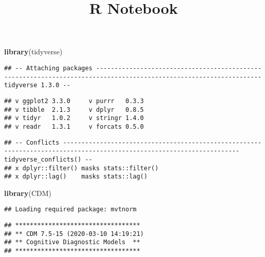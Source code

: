\documentclass[]{article}
\title{R Notebook}
\author{}
\date{\vspace{-2.5em}}
\newenvironment{Shaded}{\begin{snugshade}}{\end{snugshade}}
\newcommand{\KeywordTok}[1]{\textcolor[rgb]{0.13,0.29,0.53}{\textbf{#1}}}
\newcommand{\NormalTok}[1]{#1}
\newcommand{\OperatorTok}[1]{\textcolor[rgb]{0.81,0.36,0.00}{\textbf{#1}}}
\newcommand{\StringTok}[1]{\textcolor[rgb]{0.31,0.60,0.02}{#1}}
\begin{document}
\maketitle

\begin{Shaded}
\begin{Highlighting}[]
\KeywordTok{library}\NormalTok{(tidyverse)}
\end{Highlighting}
\end{Shaded}

\begin{verbatim}
## -- Attaching packages ------------------------------------------------------------------------------------------------------------------- tidyverse 1.3.0 --
\end{verbatim}

\begin{verbatim}
## v ggplot2 3.3.0     v purrr   0.3.3
## v tibble  2.1.3     v dplyr   0.8.5
## v tidyr   1.0.2     v stringr 1.4.0
## v readr   1.3.1     v forcats 0.5.0
\end{verbatim}

\begin{verbatim}
## -- Conflicts ---------------------------------------------------------------------------------------------------------------------- tidyverse_conflicts() --
## x dplyr::filter() masks stats::filter()
## x dplyr::lag()    masks stats::lag()
\end{verbatim}

\begin{Shaded}
\begin{Highlighting}[]
\KeywordTok{library}\NormalTok{(CDM)}
\end{Highlighting}
\end{Shaded}

\begin{verbatim}
## Loading required package: mvtnorm
\end{verbatim}

\begin{verbatim}
## **********************************
## ** CDM 7.5-15 (2020-03-10 14:19:21)      
## ** Cognitive Diagnostic Models  **
## **********************************
\end{verbatim}

\begin{Shaded}
\end{Shaded}
\end{document}
